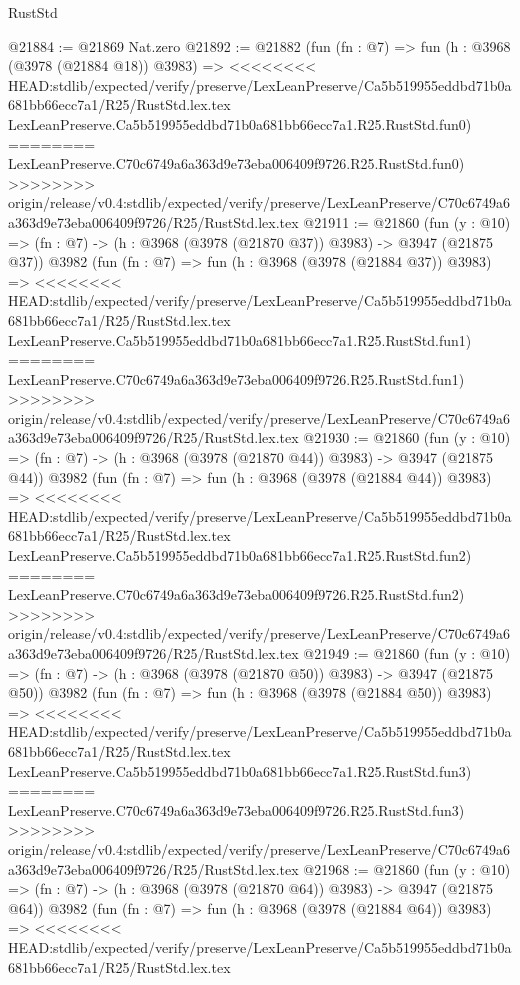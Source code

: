\begin{lexlean}{RustStd}
\begin{coremodule}
{\begin{coremodule}
{{{{{{{{{{{{{{{{{{{{{{{{{{{{{{{{{{{{{{@21884 := @21869 Nat.zero
@21892 := @21882
    (fun (fn : @7) =>
    fun (h : @3968 (@3978 (@21884 @18)) @3983) =>
<<<<<<<< HEAD:stdlib/expected/verify/preserve/LexLeanPreserve/Ca5b519955eddbd71b0a681bb66ecc7a1/R25/RustStd.lex.tex
    LexLeanPreserve.Ca5b519955eddbd71b0a681bb66ecc7a1.R25.RustStd.fun0)
========
    LexLeanPreserve.C70c6749a6a363d9e73eba006409f9726.R25.RustStd.fun0)
>>>>>>>> origin/release/v0.4:stdlib/expected/verify/preserve/LexLeanPreserve/C70c6749a6a363d9e73eba006409f9726/R25/RustStd.lex.tex
@21911 := @21860
    (fun (y : @10) => (fn : @7) -> (h : @3968 (@3978 (@21870 @37)) @3983) -> @3947 (@21875 @37))
    @3982
    (fun (fn : @7) =>
    fun (h : @3968 (@3978 (@21884 @37)) @3983) =>
<<<<<<<< HEAD:stdlib/expected/verify/preserve/LexLeanPreserve/Ca5b519955eddbd71b0a681bb66ecc7a1/R25/RustStd.lex.tex
    LexLeanPreserve.Ca5b519955eddbd71b0a681bb66ecc7a1.R25.RustStd.fun1)
========
    LexLeanPreserve.C70c6749a6a363d9e73eba006409f9726.R25.RustStd.fun1)
>>>>>>>> origin/release/v0.4:stdlib/expected/verify/preserve/LexLeanPreserve/C70c6749a6a363d9e73eba006409f9726/R25/RustStd.lex.tex
@21930 := @21860
    (fun (y : @10) => (fn : @7) -> (h : @3968 (@3978 (@21870 @44)) @3983) -> @3947 (@21875 @44))
    @3982
    (fun (fn : @7) =>
    fun (h : @3968 (@3978 (@21884 @44)) @3983) =>
<<<<<<<< HEAD:stdlib/expected/verify/preserve/LexLeanPreserve/Ca5b519955eddbd71b0a681bb66ecc7a1/R25/RustStd.lex.tex
    LexLeanPreserve.Ca5b519955eddbd71b0a681bb66ecc7a1.R25.RustStd.fun2)
========
    LexLeanPreserve.C70c6749a6a363d9e73eba006409f9726.R25.RustStd.fun2)
>>>>>>>> origin/release/v0.4:stdlib/expected/verify/preserve/LexLeanPreserve/C70c6749a6a363d9e73eba006409f9726/R25/RustStd.lex.tex
@21949 := @21860
    (fun (y : @10) => (fn : @7) -> (h : @3968 (@3978 (@21870 @50)) @3983) -> @3947 (@21875 @50))
    @3982
    (fun (fn : @7) =>
    fun (h : @3968 (@3978 (@21884 @50)) @3983) =>
<<<<<<<< HEAD:stdlib/expected/verify/preserve/LexLeanPreserve/Ca5b519955eddbd71b0a681bb66ecc7a1/R25/RustStd.lex.tex
    LexLeanPreserve.Ca5b519955eddbd71b0a681bb66ecc7a1.R25.RustStd.fun3)
========
    LexLeanPreserve.C70c6749a6a363d9e73eba006409f9726.R25.RustStd.fun3)
>>>>>>>> origin/release/v0.4:stdlib/expected/verify/preserve/LexLeanPreserve/C70c6749a6a363d9e73eba006409f9726/R25/RustStd.lex.tex
@21968 := @21860
    (fun (y : @10) => (fn : @7) -> (h : @3968 (@3978 (@21870 @64)) @3983) -> @3947 (@21875 @64))
    @3982
    (fun (fn : @7) =>
    fun (h : @3968 (@3978 (@21884 @64)) @3983) =>
<<<<<<<< HEAD:stdlib/expected/verify/preserve/LexLeanPreserve/Ca5b519955eddbd71b0a681bb66ecc7a1/R25/RustStd.lex.tex
}}}}}}}}}}}}}}}}}}}}}}}}}}}}}}}}}}}}}}
\end{coremodule}}
\end{coremodule}
\end{lexlean}
